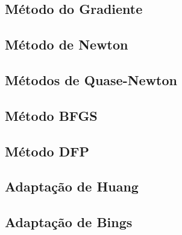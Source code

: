 \subsection{Método do Gradiente}
\subsection{Método de Newton}
\subsection{Métodos de Quase-Newton}
\subsection{Método BFGS}
\subsection{Método DFP}
\subsection{Adaptação de Huang}
\subsection{Adaptação de Bings}

\newpage